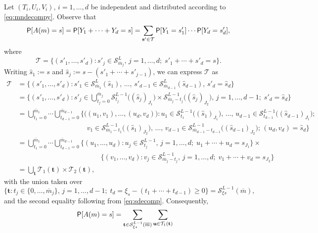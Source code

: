 \documentclass[11pt,draft]{article}
\newcommand{\Ssp}{\mathcal{S}}
\newcommand{\Tsp}{\mathcal{T}}
\newcommand{\sv}{\mathbf{s}}
\newcommand{\mb}{\overline{m}}
\begin{document}
\begin{pf}
Let $(T_i, U_i, V_i)$, $i = 1,\dots,d$ be independent and distributed according
to \eqref{eq:mndecompy}.
Observe that
\[ \P[A(m) = s] = \P[Y_1 + \cdots + Y_d = s] =
\sum_{\sv' \in \Tsp} \P[Y_1 = s'_1] \cdots \P[Y_d = s'_d], \]
where
\[ \Tsp = \big\{ (s'_1,\dots,s'_d) : s'_j \in \Ssp_{\mb_j}^L,\,
j = 1,\dots,d;\; s'_1 + \cdots + s'_d = s \big\}. \]
Writing $\hat{s}_1 := s$ and $\hat{s}_j := s - (s'_1 + \cdots + s'_{j-1})$,
we can express $\Tsp$ as
\begin{align*}
\Tsp &= \big\{ (s'_1,\dots,s'_d) :
s'_1 \in \Ssp_{\mb_1}^L(\hat{s}_1),\, \dots,\,
s'_{d-1} \in \Ssp_{\mb_{d-1}}^L(\hat{s}_{d-1}),\,
s'_d = \hat{s}_d \big\} \\
&= \Big\{ (s'_1,\dots,s'_d) : s'_j \in \textstyle\bigcup_{t_j = 0}^{\mb_j}
\Ssp_{t_j}^{L-1}\big((\hat{s}_j)_{J_1}\big) \times
\Ssp_{\mb_j - t_j}^{L-1}\big((\hat{s}_j)_{J_2}\big),\, j= 1,\dots,d-1;\;
s'_d = \hat{s}_d \Big\} \\
&= \bigcup_{t_1 = 0}^{\mb_1} \cdots \bigcup_{t_{d-1} = 0}^{\mb_{d-1}}
\Big\{ \big((u_1,v_1),\dots,(u_d,v_d)\big) :
u_1 \in \Ssp_{t_1}^{L-1}\big((\hat{s}_1)_{J_1}\big),\, \dots,\,
u_{d-1} \in \Ssp_{t_{d-1}}^{L-1}\big((\hat{s}_{d-1})_{J_1}\big); \\
&\hspace{10em}
v_1 \in \Ssp_{\mb_1 - t_1}^{L-1}\big((\hat{s}_1)_{J_2}\big),\, \dots,\,
v_{d-1} \in \Ssp_{\mb_{d-1} - t_{d-1}}^{L-1}\big((\hat{s}_{d-1})_{J_2}\big);\,
(u_d,v_d) = \hat{s}_d \Big\} \\
&= \bigcup_{t_1 = 0}^{\mb_1} \cdots \bigcup_{t_{d-1} = 0}^{\mb_{d-1}}
\big\{ (u_1,\dots,u_d) : u_j \in \Ssp_{t_j}^{L-1},\, j = 1,\dots,d;\;
u_1 + \cdots + u_d = s_{J_1} \big\} \times \\
&\hspace{12em}\big\{ (v_1,\dots,v_d) : v_j \in \Ssp_{\mb_j - t_j}^{L-1},\,
j = 1,\dots,d;\; v_1 + \cdots + v_d = s_{J_2} \big\} \\
&= \bigcup_{\mathbf{t}} \Tsp_1(\mathbf{t}) \times \Tsp_2(\mathbf{t}),
\end{align*}
with the union taken over
\[ \big\{\mathbf{t} : t_j \in \{0,\dots,\mb_j\},\, j = 1,\dots,d-1;\;
t_d = \xi_s - (t_1 + \cdots + t_{d-1}) \geq 0 \big\} = \Ssp_{\xi s}^{L-1}(\mb),
\]
and the second equality following from \eqref{eq:sdecomp}.
Consequently,
\begin{align*}
\P&[A(m) = s] = \sum_{\mathbf{t}\in\Ssp_{\xi s}^{L-1}(\mb)}
\sum_{\mathbf{u} \in \Tsp_1(\mathbf{t})}

\end{align*}
\end{pf}
\end{document}
